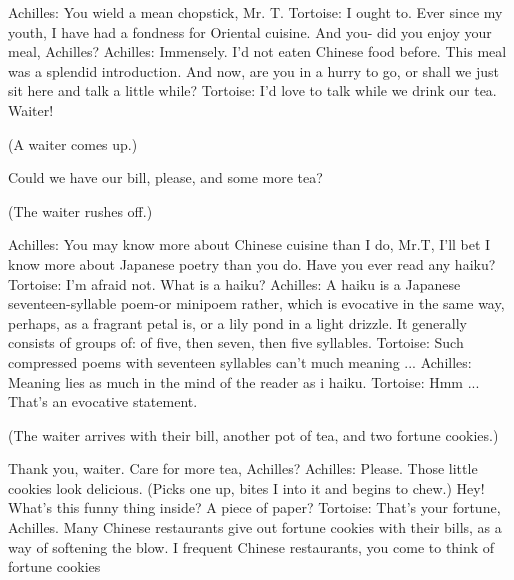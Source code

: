 Achilles: You wield a mean chopstick, Mr. T.
Tortoise: I ought to. Ever since my youth, I have had a fondness for Oriental cuisine. And you-
       did you enjoy your meal, Achilles? Achilles: Immensely. I'd not eaten Chinese food
       before. This meal was a splendid introduction. And now, are you in a hurry to go, or shall
       we just sit here and talk a little while?
Tortoise: I'd love to talk while we drink our tea. Waiter!

       (A waiter comes up.)

       Could we have our bill, please, and some more tea?

       (The waiter rushes off.)

Achilles: You may know more about Chinese cuisine than I do, Mr.T, I'll bet I know more about
       Japanese poetry than you do. Have you ever read any haiku?
Tortoise: I'm afraid not. What is a haiku?
Achilles: A haiku is a Japanese seventeen-syllable poem-or minipoem rather, which is evocative
       in the same way, perhaps, as a fragrant petal is, or a lily pond in a light drizzle. It
       generally consists of groups of: of five, then seven, then five syllables.
Tortoise: Such compressed poems with seventeen syllables can't much meaning ...
Achilles: Meaning lies as much in the mind of the reader as i haiku.
Tortoise: Hmm ... That's an evocative statement.

        (The waiter arrives with their bill, another pot of tea, and two fortune cookies.)

       Thank you, waiter. Care for more tea, Achilles?
Achilles: Please. Those little cookies look delicious. (Picks one up, bites I into it and begins to
       chew.) Hey! What's this funny thing inside? A piece of paper?
Tortoise: That's your fortune, Achilles. Many Chinese restaurants give out fortune cookies with
       their bills, as a way of softening the blow. I frequent Chinese restaurants, you come to
       think of fortune cookies

